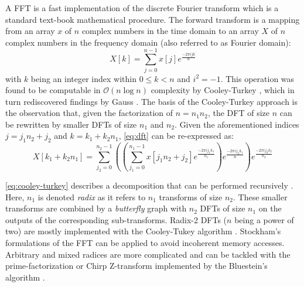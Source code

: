 A FFT is a fast implementation of the discrete Fourier transform which is a standard text-book mathematical procedure. The forward transform is a mapping from an array $x$ of $n$ complex numbers in the time domain to an array $X$ of $n$ complex numbers in the frequency domain (also referred to as Fourier domain):
%
\begin{equation}
  \label{eq:dft}
  X[k] = \sum_{j=0}^{n-1} x[j]e^{\frac{-2\pi i jk}{n}}
\end{equation}
%
with $k$ being an integer index within $0 \le k < n$ and $i^2 = -1$. This operation was found to be computable in $\mathcal{O}(n \log n)$ complexity by Cooley-Turkey \cite{cooley1965algorithm}, which in turn rediscovered findings by Gauss \cite{gauss}. The basis of the Cooley-Turkey approach is the observation that, given the factorization of $n=n_1n_2$, the  DFT of size $n$ can be rewritten by smaller DFTs of size $n_1$ and $n_2$. Given the aforementioned indices $j=j_1n_2 + j_2$ and $k=k_1+k_2n_1$, \cref{eq:dft} can be re-expressed as:
%
\begin{equation}
  \label{eq:cooley-turkey}
  X[k_1{+}k_2n_1] = \sum_{j_2=0}^{n_2-1} \left( \left( \sum_{j_1=0}^{n_1-1} x[j_1n_2{+}j_2] e^{\frac{-2\pi i j_1k_1}{n_1}} \right) e^{\frac{-2\pi i j_2k_1}{n}} \right) e^{\frac{-2\pi i j_2k_2}{n_2}}
\end{equation}

\cref{eq:cooley-turkey} describes a decomposition that can be performed recursively \cite{FFTW05}. Here, $n_1$ is denoted \emph{radix} as it refers to $n_1$ transforms of size $n_2$. These smaller transforms are combined by a \emph{butterfly} graph with $n_2$ DFTs of size $n_1$ on the outputs of the corresponding sub-transforms. Radix-2 DFTs ($n$ being a power of two) are mostly implemented with the Cooley-Tukey algorithm \cite{cooley1965algorithm}. Stockham's formulations of the FFT can be applied \cite{stockham1966high} to avoid incoherent memory accesses. Arbitrary and mixed radices are more complicated and can be tackled with the prime-factorization or Chirp Z-transform implemented by the Bluestein's algorithm \cite{bluestein}. 

